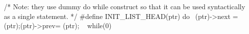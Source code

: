 \documentclass[varwidth=29em,crop]{standalone}
\begin{document}
\begin{ccode}
/* Note: they use dummy do {} while construct so that
   it can be used syntactically as a single statement. */
#define INIT_LIST_HEAD(ptr) do {             \
    (ptr)->next = (ptr);(ptr)->prev= (ptr);  \
} while(0)  
\end{ccode}
\end{document}
